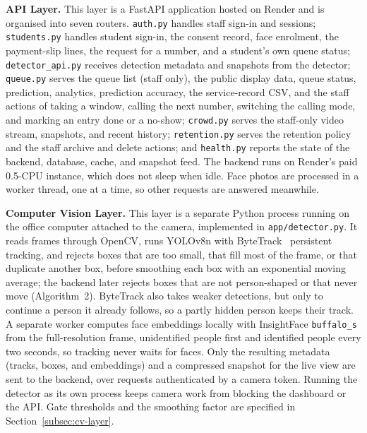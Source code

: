 \documentclass{research}
\begin{document}
\textbf{API Layer.} This layer is a FastAPI application hosted on Render
and is organised into seven routers. \texttt{auth.py} handles staff
sign-in and sessions; \texttt{students.py} handles student sign-in, the
consent record, face enrolment, the payment-slip lines, the request for
a number, and a student's own queue status; \texttt{detector\_api.py}
receives detection metadata and snapshots from the detector;
\texttt{queue.py} serves the queue list (staff only), the public display
data, queue status, prediction, analytics, prediction accuracy, the
service-record CSV, and the staff actions of taking a window, calling the
next number, switching the calling mode, and marking an entry done or a
no-show; \texttt{crowd.py} serves the staff-only video stream, snapshots,
and recent history; \texttt{retention.py} serves the retention policy
and the staff archive and delete actions; and \texttt{health.py} reports
the state of the backend, database, cache, and snapshot feed. The
backend runs on Render's paid 0.5-CPU instance, which does not sleep
when idle. Face photos are processed in a worker thread, one at a time,
so other requests are answered meanwhile.

\textbf{Computer Vision Layer.} This layer is a separate Python process
running on the office computer attached to the camera, implemented in
\texttt{app/detector.py}. It reads frames through OpenCV, runs YOLOv8n with
ByteTrack~\cite{zhang2022bytetrack} persistent tracking, and rejects
boxes that are too small, that fill most of the frame, or that
duplicate another box, before smoothing each box with an exponential
moving average; the backend later rejects boxes that are not
person-shaped or that never move (Algorithm~2). ByteTrack also takes weaker detections, but only to
continue a person it already follows, so a partly hidden person keeps
their track. A separate worker computes face embeddings locally with
InsightFace \texttt{buffalo\_s} from the full-resolution frame,
unidentified people first and identified people every two seconds, so
tracking never waits for faces.
Only the resulting metadata (tracks, boxes, and embeddings) and a
compressed snapshot for the live view are sent to the backend, over
requests authenticated by a camera token. Running the detector as its
own process keeps camera work from blocking the dashboard or the API.
Gate thresholds and the smoothing factor are specified in
Section~\ref{subsec:cv-layer}.
\end{document}
